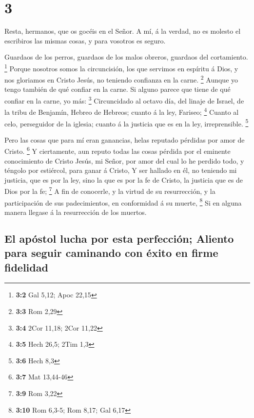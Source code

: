 \hypertarget{section-2}{%
\section{3}\label{section-2}}

 Resta, hermanos, que os gocéis en el Señor. A mí, á la
verdad, no es molesto el escribiros las mismas cosas, y para vosotros es
seguro.

 Guardaos de los perros, guardaos de los malos obreros,
guardaos del cortamiento. \footnote{\textbf{3:2} Gal 5,12; Apoc 22,15}
 Porque nosotros somos la circuncisión, los que servimos en
espíritu á Dios, y nos gloriamos en Cristo Jesús, no teniendo confianza
en la carne. \footnote{\textbf{3:3} Rom 2,29}  Aunque yo
tengo también de qué confiar en la carne. Si alguno parece que tiene de
qué confiar en la carne, yo más: \footnote{\textbf{3:4} 2Cor 11,18; 2Cor
  11,22}  Circuncidado al octavo día, del linaje de Israel,
de la tribu de Benjamín, Hebreo de Hebreos; cuanto á la ley, Fariseo;
\footnote{\textbf{3:5} Hech 26,5; 2Tim 1,3}  Cuanto al celo,
perseguidor de la iglesia; cuanto á la justicia que es en la ley,
irreprensible. \footnote{\textbf{3:6} Hech 8,3}

 Pero las cosas que para mí eran ganancias, helas reputado
pérdidas por amor de Cristo. \footnote{\textbf{3:7} Mat 13,44-46}
 Y ciertamente, aun reputo todas las cosas pérdida por el
eminente conocimiento de Cristo Jesús, mi Señor, por amor del cual lo he
perdido todo, y téngolo por estiércol, para ganar á Cristo, 
Y ser hallado en él, no teniendo mi justicia, que es por la ley, sino la
que es por la fe de Cristo, la justicia que es de Dios por la fe;
\footnote{\textbf{3:9} Rom 3,22}  A fin de conocerle, y la
virtud de su resurrección, y la participación de sus padecimientos, en
conformidad á su muerte, \footnote{\textbf{3:10} Rom 6,3-5; Rom 8,17;
  Gal 6,17}  Si en alguna manera llegase á la resurrección
de los muertos.

\hypertarget{el-apuxf3stol-lucha-por-esta-perfecciuxf3n-aliento-para-seguir-caminando-con-uxe9xito-en-firme-fidelidad}{%
\subsection{El apóstol lucha por esta perfección; Aliento para seguir
caminando con éxito en firme
fidelidad}\label{el-apuxf3stol-lucha-por-esta-perfecciuxf3n-aliento-para-seguir-caminando-con-uxe9xito-en-firme-fidelidad}}

